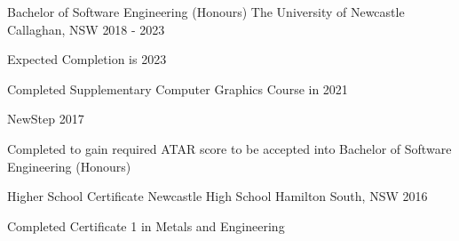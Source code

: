 

\begin{cventries}

  \cventry
    {Bachelor of Software Engineering (Honours)} %
    {The University of Newcastle} %
    {Callaghan, NSW} %
    {2018 - 2023} %
    {
      \begin{cvitems} %
        \item {Expected Completion is 2023}
        \item {Completed Supplementary Computer Graphics Course in 2021}
      \end{cvitems}
    }
  \cventry
    {NewStep} %
    {} %
    {} %
    {2017} %
    {
      \begin{cvitems} %
        \item {Completed to gain required ATAR score to be accepted into Bachelor of Software Engineering (Honours)}
      \end{cvitems}
    }

\end{cventries}

\begin{cventries}

 \cventry
    {Higher School Certificate} %
    {Newcastle High School} %
    {Hamilton South, NSW} %
    {2016} %
    {
      \begin{cvitems} %
        \item {Completed Certificate 1 in Metals and Engineering}
      \end{cvitems}
    }

\end{cventries}